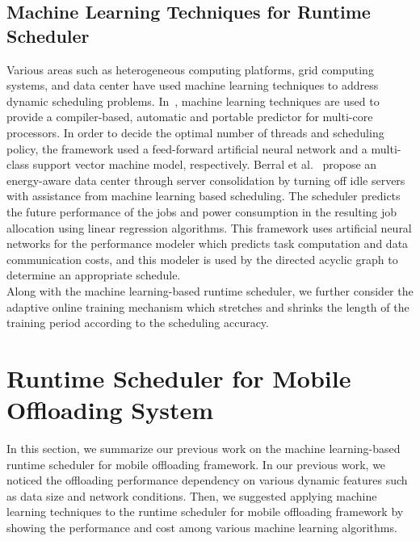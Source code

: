 \documentclass[10pt, conference, compsocconf]{IEEEtran}
\begin{document}
\subsection{Machine Learning Techniques for Runtime Scheduler}
%
Various areas such as heterogeneous computing platforms, grid computing
systems, and data center have used machine learning techniques to
address dynamic scheduling problems.
%
In~\cite{zheng}, machine learning techniques are used to provide a
compiler-based, automatic and portable predictor for multi-core
processors.
%
In order to decide the optimal number of threads and scheduling policy,
the framework used a feed-forward artificial neural network and a
multi-class support vector machine model, respectively.
%
Berral et al.~\cite{josep} propose an energy-aware
data center through server consolidation by turning off idle servers
with assistance from machine learning based scheduling.
%
The scheduler predicts the future performance of the jobs and power
consumption in the resulting job allocation using linear regression
algorithms.
%
This framework uses artificial neural networks for the performance
modeler which predicts task computation and data communication costs,
and this modeler is used by the directed acyclic graph to determine an
appropriate schedule.\\
%
\indent Along with the machine learning-based runtime scheduler, we
further consider the adaptive online training mechanism which stretches
and shrinks the length of the training period according to the scheduling
accuracy.
%
\section{Runtime Scheduler for Mobile Offloading System}
%
In this section, we summarize our previous work on the machine
learning-based runtime scheduler for mobile offloading framework.
%
In our previous work, we noticed the offloading performance dependency on
various dynamic features such as data size and network conditions.
%
Then, we suggested applying machine learning techniques to the runtime
scheduler for mobile offloading framework by showing the performance and
cost among various machine learning algorithms. 
% 
\end{document}
